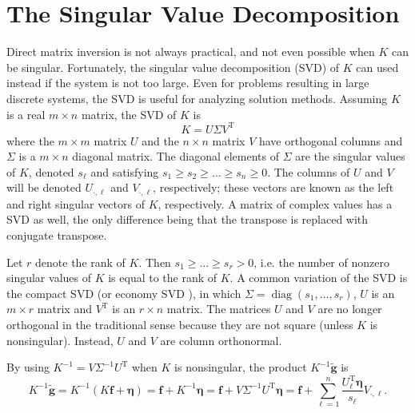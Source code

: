 \documentclass[12pt,notitlepage]{report}
\newcommand{\gnoiseVec}{\widetilde{\mathbf{g}}}	%
\newcommand{\kMat}{K}	%
\newcommand{\fVec}{\mathbf{f}}	%
\newcommand{\trans}{\mathrm{T}}	%
\DeclareMathOperator{\diag}{diag}	%
\newcommand{\noise}{\eta}	%
\newcommand{\noiseVec}{\bm{\noise}}	%
\newcommand{\singular}{s}	%
\begin{document}
\section{The Singular Value Decomposition} \label{sec:SVD}

Direct matrix inversion is not always practical, and not even possible when $\kMat$ can be singular. Fortunately, the singular value decomposition (SVD) of $\kMat$ can used instead if the system is not too large. Even for problems resulting in large discrete systems, the SVD is useful for analyzing solution methods.  Assuming $\kMat$ is a real $m \times n$ matrix, the SVD of $\kMat$ is
\begin{equation}
\kMat = U\Sigma{V^\trans}
\label{eq:SVD}
\end{equation}
where the $m \times m$ matrix $U$ and the $n \times n$ matrix $V$ have orthogonal columns and $\Sigma$ is a $m \times n$ diagonal matrix. The diagonal elements of $\Sigma$ are the singular values of $\kMat$, denoted $\singular_\ell$ and satisfying $\singular_1 \geq \singular_2 \geq \ldots \geq \singular_n \geq 0$. The columns of $U$ and $V$ will be denoted $U_{\cdot,\ell}$ and $V_{\cdot,\ell}$, respectively; these vectors are known as the left and right singular vectors of $\kMat$, respectively. A matrix of complex values has a SVD as well, the only difference being that the transpose is replaced with conjugate transpose. \par
Let $r$ denote the rank of $\kMat$. Then $\singular_1 \geq \ldots \geq \singular_r > 0$, i.e. the number of nonzero singular values of $\kMat$ is equal to the rank of $\kMat$.  A common variation of the SVD is the compact SVD (or economy SVD \cite{golub2013matrix}), in which $\Sigma = \diag(\singular_1,\ldots,\singular_r)$, $U$ is an $m \times r$ matrix and $V^\trans$ is an $r \times n$ matrix. The matrices $U$ and $V$ are no longer orthogonal in the traditional sense because they are not square (unless $\kMat$ is nonsingular). Instead, $U$ and $V$ are column orthonormal. \par 
By using $\kMat^{-1} = V\Sigma^{-1}U^\trans$ when $\kMat$ is nonsingular, the product $\kMat^{-1}\gnoiseVec$ is
\begin{equation}
\kMat^{-1}\gnoiseVec = \kMat^{-1}\left(\kMat\fVec + \noiseVec\right) = \fVec + \kMat^{-1}\noiseVec = \fVec + V\Sigma^{-1}{U^\trans}\noiseVec = \fVec + \sum_{\ell = 1}^n \frac{{U^\trans_\ell}\noiseVec}{\singular_\ell}V_{\cdot,\ell}. 
\label{eq:InvProd}
\end{equation}
\end{document}

